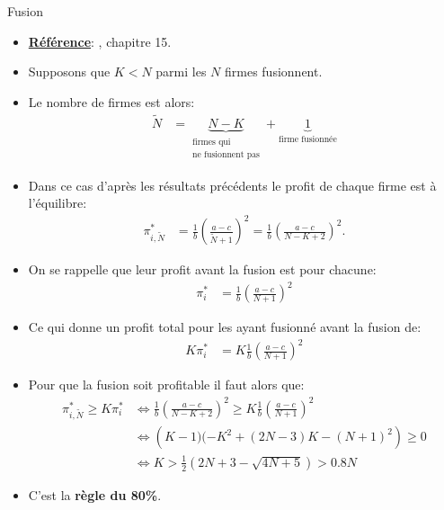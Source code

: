 \begin{frame}[allowframebreaks]{Fusion}
    \begin{itemize}
    \item \textbf{\underline{Référence}}: \cite{belleflamme_peitz_2015}, chapitre 15.
    \item Supposons que $K<N$  parmi les $N$ firmes fusionnent.
    \item Le nombre de firmes est alors:
    \begin{align*}
        \tilde{N} &= \underbrace{N-K}_{\substack{\text{firmes qui}\\\text{ne fusionnent pas}}} + \underbrace{1}_{\text{firme fusionnée}}
    \end{align*}
    \item Dans ce cas d'après les résultats précédents le profit de chaque firme est à l'équilibre:
    \begin{align*}
        \pi_{i, \tilde{N}}^* &= \frac{1}{b}\left(\frac{a-c}{\tilde{N}+1}\right)^2
        = \frac{1}{b}\left(\frac{a-c}{N-K+2}\right)^2.
    \end{align*}
    \item On se rappelle que leur profit avant la fusion est pour chacune:
    \begin{align*}
        \pi_i^* &= \frac{1}{b}\left(\frac{a-c}{N+1}\right)^2
    \end{align*}
    \item Ce qui donne un profit total pour les ayant fusionné avant la fusion de:
    \begin{align*}
        K\pi_i^* &= K\frac{1}{b}\left(\frac{a-c}{N+1}\right)^2
    \end{align*}
    \item Pour que la fusion soit profitable il faut alors que:
    \begin{align*}
        \pi_{i, \tilde{N}}^* \geq K\pi_i^*& \Leftrightarrow
         \frac{1}{b}\left(\frac{a-c}{N-K+2}\right)^2  \geq K\frac{1}{b}\left(\frac{a-c}{N+1}\right)^2\\
         &\Leftrightarrow \left(K-1)(-K^2+(2N-3)K-(N+1)^2\right) \geq 0\\
         &\Leftrightarrow K > \frac{1}{2}\left(2N+3-\sqrt{4N+5}\right) > 0.8N
    \end{align*}
    \item C'est la \textbf{règle du 80\%}.
\end{itemize}
\end{frame}

